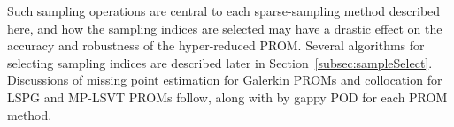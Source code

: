Such sampling operations are central to each sparse-sampling method described here, and how the sampling indices are selected may have a drastic effect on the accuracy and robustness of the hyper-reduced PROM. Several algorithms for selecting sampling indices are described later in Section~\ref{subsec:sampleSelect}. Discussions of missing point estimation for Galerkin PROMs and collocation for LSPG and MP-LSVT PROMs follow, along with by gappy POD for each PROM method.